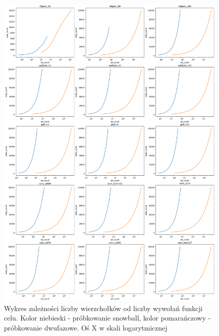 \begin{figure}[h!]
    \centering
    \includegraphics[width=\textwidth]{chapters/experiments/img/opt_nodes.png}
    \caption{Wykres zależności liczby wierzchołków od liczby wywołań funkcji celu.
        Kolor niebieski - próbkowanie snowball, kolor pomarańczowy - próbkowanie dwufazowe.
        Oś X w skali logarytmicznej}
    \label{fig:main_opt_nodes}
\end{figure}


